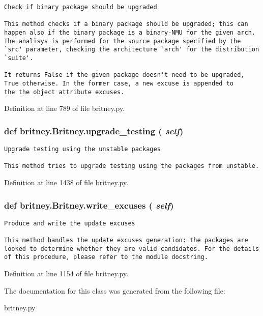 \footnotesize\begin{verbatim}Check if binary package should be upgraded

This method checks if a binary package should be upgraded; this can
happen also if the binary package is a binary-NMU for the given arch.
The analisys is performed for the source package specified by the
`src' parameter, checking the architecture `arch' for the distribution
`suite'.
       
It returns False if the given package doesn't need to be upgraded,
True otherwise. In the former case, a new excuse is appended to
the the object attribute excuses.
\end{verbatim}
\normalsize
 

Definition at line 789 of file britney.py.
\subsubsection{\setlength{\rightskip}{0pt plus 5cm}def britney.Britney.upgrade\_\-testing ( {\em self})}\label{classbritney_1_1Britney_921effe0d64ed713c38888684a0a26d4}




\footnotesize\begin{verbatim}Upgrade testing using the unstable packages

This method tries to upgrade testing using the packages from unstable.
\end{verbatim}
\normalsize
 

Definition at line 1438 of file britney.py.
\subsubsection{\setlength{\rightskip}{0pt plus 5cm}def britney.Britney.write\_\-excuses ( {\em self})}\label{classbritney_1_1Britney_010f6deffca32f7f71ecf1f5c1bb4985}




\footnotesize\begin{verbatim}Produce and write the update excuses

This method handles the update excuses generation: the packages are
looked to determine whether they are valid candidates. For the details
of this procedure, please refer to the module docstring.
\end{verbatim}
\normalsize
 

Definition at line 1154 of file britney.py.

The documentation for this class was generated from the following file:\begin{CompactItemize}
\item 
britney.py\end{CompactItemize}
